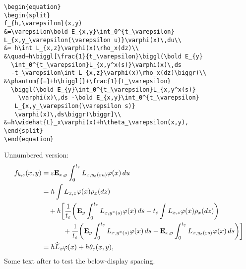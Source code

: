 \begin{verbatim}
\begin{equation}
\begin{split}
f_{h,\varepsilon}(x,y)
&=\varepsilon\bold E_{x,y}\int_0^{t_\varepsilon}
L_{x,y_\varepsilon(\varepsilon u)}\varphi(x)\,du\\
&= h\int L_{x,z}\varphi(x)\rho_x(dz)\\
&\quad+h\biggl[\frac{1}{t_\varepsilon}\biggl(\bold E_{y}
  \int_0^{t_\varepsilon}L_{x,y^x(s)}\varphi(x)\,ds
  -t_\varepsilon\int L_{x,z}\varphi(x)\rho_x(dz)\biggr)\\
&\phantom{{=}+h\biggl[}+\frac{1}{t_\varepsilon}
  \biggl(\bold E_{y}\int_0^{t_\varepsilon}L_{x,y^x(s)}
    \varphi(x)\,ds -\bold E_{x,y}\int_0^{t_\varepsilon}
   L_{x,y_\varepsilon(\varepsilon s)}
   \varphi(x)\,ds\biggr)\biggr]\\
&=h\widehat{L}_x\varphi(x)+h\theta_\varepsilon(x,y),
\end{split}
\end{equation}
\end{verbatim}

\newpage
Unnumbered version:
\begin{equation*}
\begin{split}
f_{h,\varepsilon}(x,y)
&=\varepsilon\bold E_{x,y}\int_0^{t_\varepsilon}
L_{x,y_\varepsilon(\varepsilon u)}\varphi(x)\,du\\
&= h\int L_{x,z}\varphi(x)\rho_x(dz)\\
&\quad+h\biggl[\frac{1}{t_\varepsilon}\biggl(\bold E_{y}
  \int_0^{t_\varepsilon}L_{x,y^x(s)}\varphi(x)\,ds
  -t_\varepsilon\int L_{x,z}\varphi(x)\rho_x(dz)\biggr)\\
&\phantom{{=}+h\biggl[}+\frac{1}{t_\varepsilon}
  \biggl(\bold E_{y}\int_0^{t_\varepsilon}L_{x,y^x(s)}
    \varphi(x)\,ds -\bold E_{x,y}\int_0^{t_\varepsilon}
   L_{x,y_\varepsilon(\varepsilon s)}
   \varphi(x)\,ds\biggr)\biggr]\\
&=h\widehat{L}_x\varphi(x)+h\theta_\varepsilon(x,y),
\end{split}
\end{equation*}
Some text after to test the below-display spacing.

